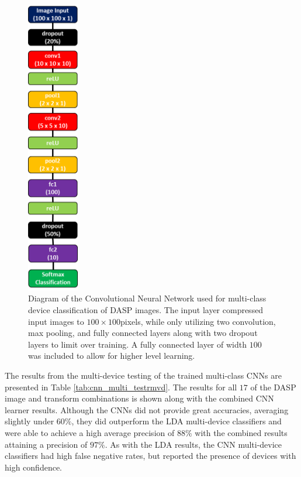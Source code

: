 \begin{figure}[htbp!]
	\includegraphics[width=0.2\textwidth,keepaspectratio]{./misc_graphics/dasp_cnn_multi_network.png}
	\centering
	\caption{Diagram of the Convolutional Neural Network used for multi-class device classification of DASP images. The input layer compressed input images to $100 \times 100$pixels, while only utilizing two convolution, max pooling, and fully connected layers along with two dropout layers to limit over training.  A fully connected layer of width $100$ was included to allow for higher level learning.}
	\label{fig:cnn_net_multi}
\end{figure}

The results from the multi-device testing of the trained multi-class CNNs are presented in Table \ref{tab:cnn_multi_testrmvd}.  The results for all $17$ of the DASP image and transform combinations is shown along with the combined CNN learner results.  Although the CNNs did not provide great accuracies, averaging slightly under $60\%$, they did outperform the LDA multi-device classifiers and were able to achieve a high average precision of $88\%$ with the combined results attaining a precision of $97\%$.  As with the LDA results, the CNN multi-device classifiers had high false negative rates, but reported the presence of devices with high confidence.

